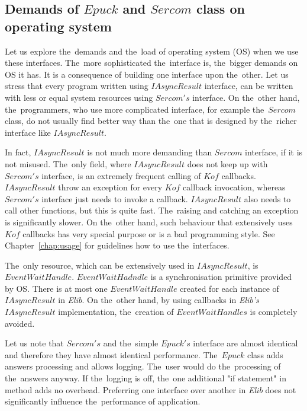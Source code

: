   \subsection*{Demands of $Epuck$ and $Sercom$ class on operating system} 
  Let us explore the~demands and the~load of operating system (OS) when we use these interfaces.
  The~more sophisticated the~interface is, the~bigger demands on OS it has.
  It is a consequence of building one interface upon the~other.
  Let us stress that every program written using $IAsyncResult$ interface, 
  can be written with less or equal system resources using $Sercom's$
  interface. On the~other hand, the~programmers, 
  who use more complicated interface, for example the~$Sercom$ class, do not usually find better way 
  than the~one that is designed by the~richer interface like $IAsyncResult$.

  In fact, $IAsyncResult$ is not much more demanding than $Sercom$ interface, if it is not misused.
  The~only field, where $IAsyncResult$ does not keep up with $Sercom's$ interface, 
  is an extremely frequent calling of $Kof$ callbacks.
  $IAsyncResult$ throw an exception for every $Kof$ callback invocation, 
  whereas $Sercom's$ interface just needs to invoke a callback.
  $IAsyncResult$ also needs to call other functions, but this is quite fast. 
  The~raising and catching an exception is significantly slower.
  On the~other hand, such behaviour that extensively uses $Kof$ callbacks 
  has very special purpose or is a bad programming style.
  See Chapter~\ref{chap:usage} for guidelines how to use the~interfaces.

  The~only resource, which can be extensively used in $IAsyncResult$, is $EventWaitHandle$. 
  $EventWaitHadndle$ is a synchronisation primitive provided
  by OS. There is at most one $EventWaitHandle$ created for each instance of $IAsyncResult$ in {\it Elib}. 
  On the~other hand, by using callbacks in {\it Elib's} $IAsyncResult$
  implementation, the~creation of $EventWaitHandles$ is completely avoided.

  Let us note that $Sercom's$ and the~simple $Epuck's$ interface 
  are almost identical and therefore they have almost identical performance.
  The~$Epuck$ class adds answers processing and allows logging. 
  The~user would do the~processing of the~answers anyway.
  If the~logging is off, the~one additional "if statement" in method adds no overhead. 
  Preferring one interface over another in {\it Elib} does not significantly influence the~performance of application.

